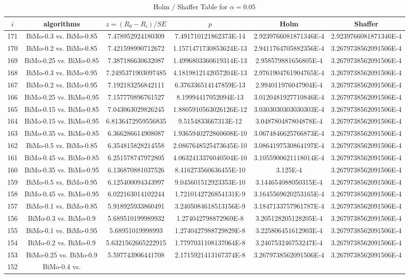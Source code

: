 \documentclass[a4paper,10pt]{article}
\begin{document}
\begin{landscape}
\begin{table}[!htp]
\centering\tiny
\caption{Holm / Shaffer Table for $\alpha=0.05$}
\begin{tabular}{cccccc}
$i$&algorithms&$z=(R_0 - R_i)/SE$&$p$&Holm&Shaffer\\
\hline
171&BiMo-0.3 vs. BiMo-0.85&7.478952924180309&7.491710121862373E-14&2.9239766081871346E-4&2.9239766081871346E-4\\170&BiMo-0.2 vs. BiMo-0.85&7.421598990712672&1.1571471730853624E-13&2.9411764705882356E-4&3.2679738562091506E-4\\169&BiMo-0.25 vs. BiMo-0.85&7.387186630632087&1.4996803360619314E-13&2.958579881656805E-4&3.2679738562091506E-4\\168&BiMo-0.3 vs. BiMo-0.95&7.2495371903097485&4.1819812142057204E-13&2.9761904761904765E-4&3.2679738562091506E-4\\167&BiMo-0.2 vs. BiMo-0.95&7.192183256842111&6.376336514147859E-13&2.994011976047904E-4&3.2679738562091506E-4\\166&BiMo-0.25 vs. BiMo-0.95&7.157770896761527&8.19994417052094E-13&3.0120481927710846E-4&3.2679738562091506E-4\\165&BiMo-0.15 vs. BiMo-0.85&7.043063029826245&1.8805910563026126E-12&3.0303030303030303E-4&3.2679738562091506E-4\\164&BiMo-0.15 vs. BiMo-0.95&6.8136472959556835&9.5154833667313E-12&3.048780487804878E-4&3.2679738562091506E-4\\163&BiMo-0.35 vs. BiMo-0.85&6.366286614908087&1.9365940272860608E-10&3.0674846625766873E-4&3.2679738562091506E-4\\162&BiMo-0.5 vs. BiMo-0.85&6.354815828214558&2.0867648525473645E-10&3.0864197530864197E-4&3.2679738562091506E-4\\161&BiMo-0.45 vs. BiMo-0.85&6.251578747972805&4.0632413376040504E-10&3.1055900621118014E-4&3.2679738562091506E-4\\160&BiMo-0.35 vs. BiMo-0.95&6.136870881037526&8.416273560636455E-10&3.125E-4&3.2679738562091506E-4\\159&BiMo-0.5 vs. BiMo-0.95&6.125400094343997&9.045601512923353E-10&3.144654088050315E-4&3.2679738562091506E-4\\158&BiMo-0.45 vs. BiMo-0.95&6.022163014102244&1.7210142726854131E-9&3.1645569620253165E-4&3.2679738562091506E-4\\157&BiMo-0.1 vs. BiMo-0.85&5.918925933860491&3.2405084618513156E-9&3.1847133757961787E-4&3.2679738562091506E-4\\156&BiMo-0.3 vs. BiMo-0.9&5.689510199989932&1.274042798872969E-8&3.205128205128205E-4&3.2679738562091506E-4\\155&BiMo-0.1 vs. BiMo-0.95&5.68951019998993&1.2740427988729829E-8&3.225806451612903E-4&3.2679738562091506E-4\\154&BiMo-0.2 vs. BiMo-0.9&5.6321562665222915&1.7797031108137064E-8&3.246753246753247E-4&3.2679738562091506E-4\\153&BiMo-0.25 vs. BiMo-0.9&5.597743906441708&2.1715921413167374E-8&3.2679738562091506E-4&3.2679738562091506E-4\\152&BiMo-0.4 vs. 
\end{tabular}
\end{table}
\end{landscape}
\end{document}

